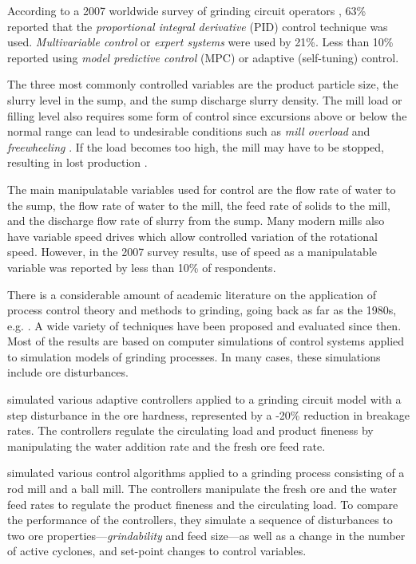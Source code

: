 According to a 2007 worldwide survey of grinding circuit operators \citep{wei_grinding_2009}, 63\% reported that the \textit{proportional integral derivative} (PID) control technique was used. \textit{Multivariable control} or \textit{expert systems} were used by 21\%. Less than 10\% reported using \textit{model predictive control} (MPC) or adaptive (self-tuning) control.

The three most commonly controlled variables are the product particle size, the slurry level in the sump, and the sump discharge slurry density. The mill load or filling level also requires some form of control since excursions above or below the normal range can lead to undesirable conditions such as \textit{mill overload} and \textit{freewheeling} \citep{mcclure_overload_2015}. If the load becomes too high, the mill may have to be stopped, resulting in lost production \citep{wei_grinding_2009}.

The main manipulatable variables used for control are the flow rate of water to the sump, the flow rate of water to the mill, the feed rate of solids to the mill, and the discharge flow rate of slurry from the sump. Many modern mills also have variable speed drives which allow controlled variation of the rotational speed. However, in the 2007 survey results, use of speed as a manipulatable variable was reported by less than 10\% of respondents.

There is a considerable amount of academic literature on the application of process control theory and methods to grinding, going back as far as the 1980s, e.g. \cite{herbst_optimal_1988}. A wide variety of techniques have been proposed and evaluated since then. Most of the results are based on computer simulations of control systems applied to simulation models of grinding processes. In many cases, these simulations include ore disturbances.

\cite{najim_adaptive_1995} simulated various adaptive controllers applied to a grinding circuit model with a step disturbance in the ore hardness, represented by a -20\% reduction in breakage rates. The controllers regulate the circulating load and product fineness by manipulating the water addition rate and the fresh ore feed rate.

\cite{pomerleau_survey_2000} simulated various control algorithms applied to a grinding process consisting of a rod mill and a ball mill. The controllers manipulate the fresh ore and the water feed rates to regulate the product fineness and the circulating load. To compare the performance of the controllers, they simulate a sequence of disturbances to two ore properties---\textit{grindability} and feed size---as well as a change in the number of active cyclones, and set-point changes to control variables.

